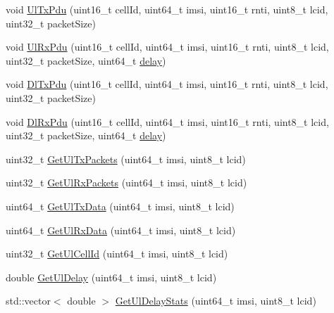 \begin{DoxyCompactItemize}
\item 
void \hyperlink{classns3_1_1MmWaveBearerStatsCalculator_ac2ba4337cbd326e2d9e7dd003cda5e65}{Ul\+Tx\+Pdu} (uint16\+\_\+t cell\+Id, uint64\+\_\+t imsi, uint16\+\_\+t rnti, uint8\+\_\+t lcid, uint32\+\_\+t packet\+Size)
\item 
void \hyperlink{classns3_1_1MmWaveBearerStatsCalculator_adfc452d44ddead6031d9b6f82f0ff82d}{Ul\+Rx\+Pdu} (uint16\+\_\+t cell\+Id, uint64\+\_\+t imsi, uint16\+\_\+t rnti, uint8\+\_\+t lcid, uint32\+\_\+t packet\+Size, uint64\+\_\+t \hyperlink{mmwave_2model_2fading-traces_2fading__trace__generator_8m_a7964e6aa8f61a9d28973c8267a606ad8}{delay})
\item 
void \hyperlink{classns3_1_1MmWaveBearerStatsCalculator_a88d5ccde3f5dc1c684d846fc875bd1dc}{Dl\+Tx\+Pdu} (uint16\+\_\+t cell\+Id, uint64\+\_\+t imsi, uint16\+\_\+t rnti, uint8\+\_\+t lcid, uint32\+\_\+t packet\+Size)
\item 
void \hyperlink{classns3_1_1MmWaveBearerStatsCalculator_a794afdcf9dc1ca0d2f311a5424254b0d}{Dl\+Rx\+Pdu} (uint16\+\_\+t cell\+Id, uint64\+\_\+t imsi, uint16\+\_\+t rnti, uint8\+\_\+t lcid, uint32\+\_\+t packet\+Size, uint64\+\_\+t \hyperlink{mmwave_2model_2fading-traces_2fading__trace__generator_8m_a7964e6aa8f61a9d28973c8267a606ad8}{delay})
\item 
uint32\+\_\+t \hyperlink{classns3_1_1MmWaveBearerStatsCalculator_a46ac422cb73a1783dd612dcb451c1826}{Get\+Ul\+Tx\+Packets} (uint64\+\_\+t imsi, uint8\+\_\+t lcid)
\item 
uint32\+\_\+t \hyperlink{classns3_1_1MmWaveBearerStatsCalculator_ac892abcdd54ff9f84c722aaf6524fc38}{Get\+Ul\+Rx\+Packets} (uint64\+\_\+t imsi, uint8\+\_\+t lcid)
\item 
uint64\+\_\+t \hyperlink{classns3_1_1MmWaveBearerStatsCalculator_ab78a9bb574055dfb4fab4218baebc792}{Get\+Ul\+Tx\+Data} (uint64\+\_\+t imsi, uint8\+\_\+t lcid)
\item 
uint64\+\_\+t \hyperlink{classns3_1_1MmWaveBearerStatsCalculator_a7aacbef917cf041535e3f794045cb42e}{Get\+Ul\+Rx\+Data} (uint64\+\_\+t imsi, uint8\+\_\+t lcid)
\item 
uint32\+\_\+t \hyperlink{classns3_1_1MmWaveBearerStatsCalculator_a53c4cf1c9091c9f0f37d0134adda6396}{Get\+Ul\+Cell\+Id} (uint64\+\_\+t imsi, uint8\+\_\+t lcid)
\item 
double \hyperlink{classns3_1_1MmWaveBearerStatsCalculator_a5afee2850f66c0cb069d5024790e5e67}{Get\+Ul\+Delay} (uint64\+\_\+t imsi, uint8\+\_\+t lcid)
\item 
std\+::vector$<$ double $>$ \hyperlink{classns3_1_1MmWaveBearerStatsCalculator_aba42a6ac5c551058eea70a872fe6ebc9}{Get\+Ul\+Delay\+Stats} (uint64\+\_\+t imsi, uint8\+\_\+t lcid)

\end{DoxyCompactItemize}
